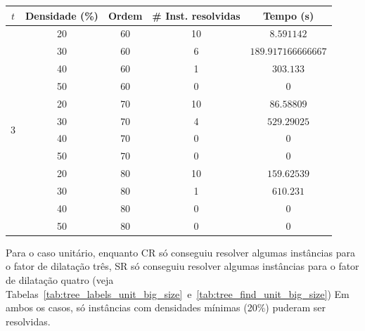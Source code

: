 \begin{center}
\noindent
\footnotesize{
\begin{tabular}{|c|c|c|c|c|}\hline
{$t$} & {Densidade (\%)} & {Ordem} & {\# Inst. resolvidas} & {Tempo (s)}
\\ \hline\hline
\multirow{12}{*}{3}	&	20	&	60	&	10	&	$\num{8,591142}$	\\
	&	30	&	60	&	6	&	$\num{189,917166666667}$	\\
	&	40	&	60	&	1	&	$\num{303,133}$	\\
	&	50	&	60	&	0	&	$\num{0}$	\\
	&	20	&	70	&	10	&	$\num{86,58809}$	\\
	&	30	&	70	&	4	&	$\num{529,29025}$	\\
	&	40	&	70	&	0	&	$\num{0}$	\\
	&	50	&	70	&	0	&	$\num{0}$	\\
	&	20	&	80	&	10	&	$\num{159,62539}$	\\
	&	30	&	80	&	1	&	$\num{610,231}$	\\
	&	40	&	80	&	0	&	$\num{0}$	\\
	&	50	&	80	&	0	&	$\num{0}$	\\
\hline\hline
\end{tabular}
}
\label{tab:tree_find_small_random_big_size}
\end{center}

Para o caso unitário, enquanto CR só conseguiu resolver algumas
instâncias para o fator de dilatação três, SR só conseguiu resolver
algumas instâncias para o fator de dilatação quatro (veja Tabelas~\ref{tab:tree_labels_unit_big_size}~e~\ref{tab:tree_find_unit_big_size})
Em ambos os casos, só
instâncias com densidades mínimas (20\%) puderam ser resolvidas.


